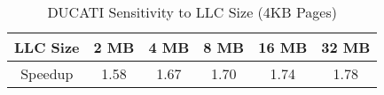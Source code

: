 \begin {table}[h]
\begin{center} 
\caption{\small DUCATI Sensitivity to LLC Size (4KB Pages) }
\begin{tabular}{| c | c | c | c | c | c | }
\hline
 LLC Size   & 2 MB  & 4 MB  & 8 MB  & 16 MB & 32 MB \\ \hline
 Speedup    & 1.58 & 1.67 & 1.70 & 1.74 & 1.78 \\ \hline

\end{tabular}
\label{table:LLC_sens}
\vspace{-0.3in}
\end{center}
\end{table}
